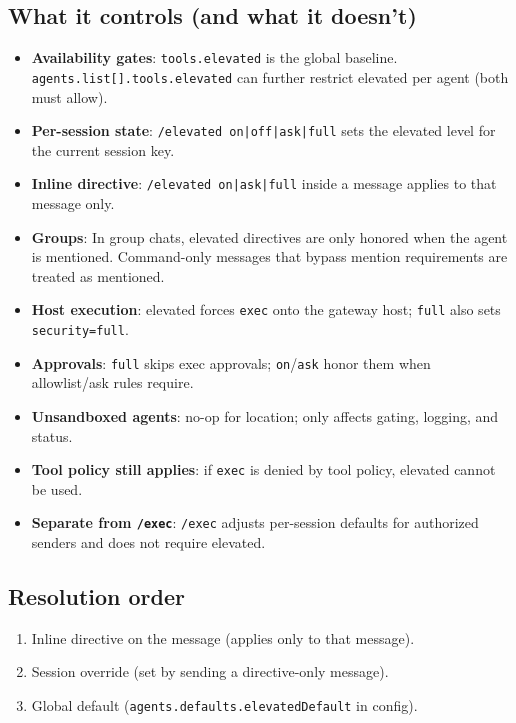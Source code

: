 \subsection{What it controls (and what it doesn’t)}


\begin{itemize}
  \item \textbf{Availability gates}: \texttt{tools.elevated} is the global baseline. \texttt{agents.list[].tools.elevated} can further restrict elevated per agent (both must allow).
  \item \textbf{Per-session state}: \texttt{/elevated on|off|ask|full} sets the elevated level for the current session key.
  \item \textbf{Inline directive}: \texttt{/elevated on|ask|full} inside a message applies to that message only.
  \item \textbf{Groups}: In group chats, elevated directives are only honored when the agent is mentioned. Command-only messages that bypass mention requirements are treated as mentioned.
  \item \textbf{Host execution}: elevated forces \texttt{exec} onto the gateway host; \texttt{full} also sets \texttt{security=full}.
  \item \textbf{Approvals}: \texttt{full} skips exec approvals; \texttt{on}/\texttt{ask} honor them when allowlist/ask rules require.
  \item \textbf{Unsandboxed agents}: no-op for location; only affects gating, logging, and status.
  \item \textbf{Tool policy still applies}: if \texttt{exec} is denied by tool policy, elevated cannot be used.
  \item \textbf{Separate from \texttt{/exec}}: \texttt{/exec} adjusts per-session defaults for authorized senders and does not require elevated.
\end{itemize}


\subsection{Resolution order}


\begin{enumerate}
  \item Inline directive on the message (applies only to that message).
  \item Session override (set by sending a directive-only message).
  \item Global default (\texttt{agents.defaults.elevatedDefault} in config).
\end{enumerate}


